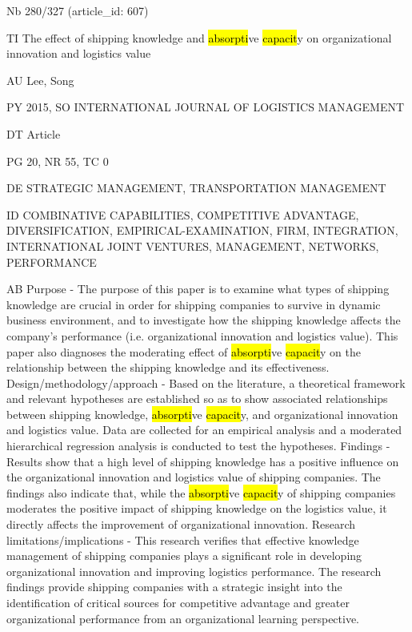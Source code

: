 \documentclass[a4paper]{article}
\begin{document}
\vspace*{-2cm}
Nb \tabto{0cm}280/327 (article\_id: 607)\par
TI \tabto{0cm}The effect of shipping knowledge and \hl{absorpti}ve \hl{capacit}y on organizational innovation and logistics value\par
AU \tabto{0cm}Lee, Song\par
PY \tabto{0cm}2015, SO INTERNATIONAL JOURNAL OF LOGISTICS MANAGEMENT\par
DT \tabto{0cm}Article\par
PG \tabto{0cm}20, NR 55, TC 0\par
DE \tabto{0cm}STRATEGIC MANAGEMENT, TRANSPORTATION MANAGEMENT\par
ID \tabto{0cm}COMBINATIVE CAPABILITIES, COMPETITIVE ADVANTAGE, DIVERSIFICATION, EMPIRICAL-EXAMINATION, FIRM, INTEGRATION, INTERNATIONAL JOINT VENTURES, MANAGEMENT, NETWORKS, PERFORMANCE\par
AB \tabto{0cm}Purpose - The purpose of this paper is to examine what types of shipping knowledge are crucial in order for shipping companies to survive in dynamic business environment, and to investigate how the shipping knowledge affects the company's performance (i.e. organizational innovation and logistics value). This paper also diagnoses the moderating effect of \hl{absorpti}ve \hl{capacit}y on the relationship between the shipping knowledge and its effectiveness.
Design/methodology/approach - Based on the literature, a theoretical framework and relevant hypotheses are established so as to show associated relationships between shipping knowledge, \hl{absorpti}ve \hl{capacit}y, and organizational innovation and logistics value. Data are collected for an empirical analysis and a moderated hierarchical regression analysis is conducted to test the hypotheses.
Findings - Results show that a high level of shipping knowledge has a positive influence on the organizational innovation and logistics value of shipping companies. The findings also indicate that, while the \hl{absorpti}ve \hl{capacit}y of shipping companies moderates the positive impact of shipping knowledge on the logistics value, it directly affects the improvement of organizational innovation.
Research limitations/implications - This research verifies that effective knowledge management of shipping companies plays a significant role in developing organizational innovation and improving logistics performance. The research findings provide shipping companies with a strategic insight into the identification of critical sources for competitive advantage and greater organizational performance from an organizational learning perspective.
\end{document}
